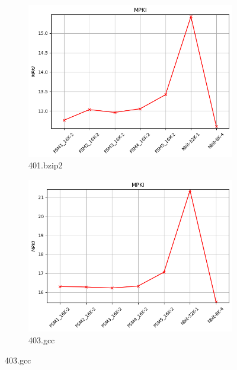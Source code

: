 \documentclass{article}
\begin{document}
\begin{figure}[H]
    \centering

    \begin{subfigure}[b]{0.45\textwidth}
        \includegraphics[width=\textwidth]{figures/5_3_c/401.bzip2.cslab_branch_preds_ref.out.png}
        \caption{401.bzip2}
        \label{fig:plot33}
    \end{subfigure}
    \hfill
    \begin{subfigure}[b]{0.45\textwidth}
        \includegraphics[width=\textwidth]{figures/5_3_c/403.gcc.cslab_branch_preds_ref.out.png}
        \caption{403.gcc}
        \label{fig:plot34}
    \end{subfigure}


\end{figure}
\end{document}
